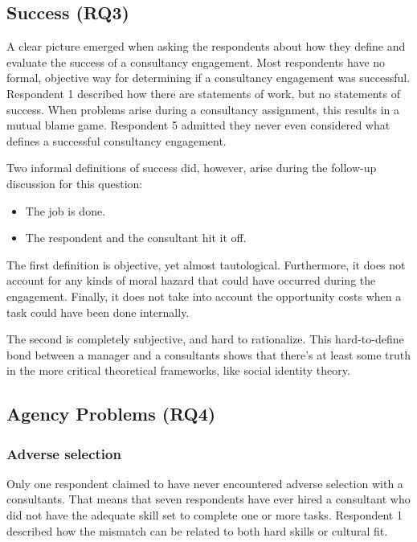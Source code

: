 \documentclass[
  man,floatsintext]{apa6}
\begin{document}
\subsection{Success (RQ3)}\label{success-rq3}

A clear picture emerged when asking the respondents about how they define and evaluate the success of a consultancy engagement. Most respondents have no formal, objective way for determining if a consultancy engagement was successful. Respondent 1 described how there are statements of work, but no statements of success. When problems arise during a consultancy assignment, this results in a mutual blame game. Respondent 5 admitted they never even considered what defines a successful consultancy engagement.

Two informal definitions of success did, however, arise during the follow-up discussion for this question:

\begin{itemize}
\item
  The job is done.
\item
  The respondent and the consultant hit it off.
\end{itemize}

The first definition is objective, yet almost tautological. Furthermore, it does not account for any kinds of moral hazard that could have occurred during the engagement. Finally, it does not take into account the opportunity costs when a task could have been done internally.

The second is completely subjective, and hard to rationalize. This hard-to-define bond between a manager and a consultants shows that there's at least some truth in the more critical theoretical frameworks, like social identity theory.

\subsection{Agency Problems (RQ4)}\label{agency-problems-rq4}

\subsubsection{Adverse selection}\label{adverse-selection}

Only one respondent claimed to have never encountered adverse selection with a consultants. That means that seven respondents have ever hired a consultant who did not have the adequate skill set to complete one or more tasks. Respondent 1 described how the mismatch can be related to both hard skills or cultural fit.
\end{document}
